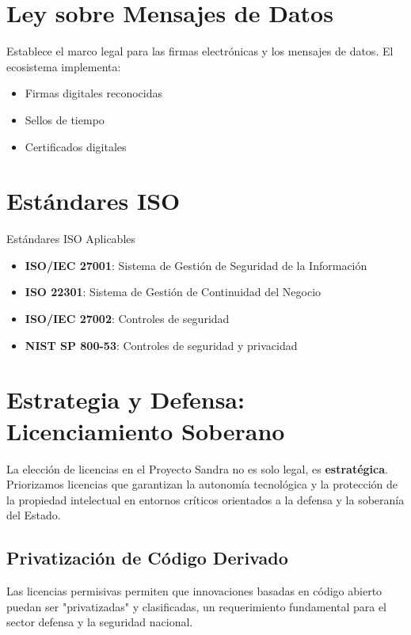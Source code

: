 \section{Ley sobre Mensajes de Datos}

Establece el marco legal para las firmas electr\'onicas y los mensajes de datos. El ecosistema implementa:
\begin{itemize}
\item Firmas digitales reconocidas
\item Sellos de tiempo
\item Certificados digitales
\end{itemize}

\section{Est\'andares ISO}

\begin{caja}{Est\'andares ISO Aplicables}
\begin{itemize}
\item \textbf{ISO/IEC 27001}: Sistema de Gesti\'on de Seguridad de la Informaci\'on
\item \textbf{ISO 22301}: Sistema de Gesti\'on de Continuidad del Negocio
\item \textbf{ISO/IEC 27002}: Controles de seguridad
\item \textbf{NIST SP 800-53}: Controles de seguridad y privacidad
\end{itemize}
\end{caja}

\section{Estrategia y Defensa: Licenciamiento Soberano}

La elección de licencias en el Proyecto Sandra no es solo legal, es \textbf{estratégica}. Priorizamos licencias que garantizan la autonomía tecnológica y la protección de la propiedad intelectual en entornos críticos orientados a la defensa y la soberanía del Estado.

\subsection{Privatizaci\'on de C\'odigo Derivado}
Las licencias permisivas permiten que innovaciones basadas en código abierto puedan ser "privatizadas" y clasificadas, un requerimiento fundamental para el sector defensa y la seguridad nacional.

